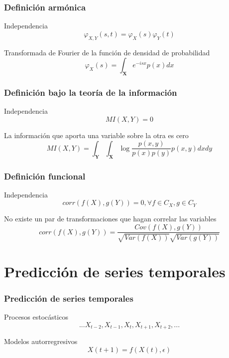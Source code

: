 \documentclass[t,9pt,pdftex]{beamer}
\begin{document}
\begin{frame}[c]
	\frametitle{Definici\'on arm\'onica}
	\begin{block}{Independencia}
		$$\varphi_{X,Y}(s,t) = \varphi_X(s)\varphi_Y(t)$$
	\end{block}
	
	\begin{exampleblock}{Transformada de Fourier de la funci\'on de densidad de probabilidad}
		$$\varphi_X(s) = \int_{\textbf{X}}{e^{-i s x} p(x)dx} $$
	\end{exampleblock}
\end{frame}



\begin{frame}[c]
	\frametitle{Definici\'on bajo la teor\'ia de la informaci\'on}
	\begin{block}{Independencia}
		$$MI(X,Y)=0$$
	\end{block}
	
	\begin{exampleblock}{La informaci\'on que aporta una variable sobre la otra es cero}
		$$MI(X,Y) = \int_{\textbf{Y}}{\int_{\textbf{X}}{ \log{ \frac{p(x,y)}{p(x) p(y)}}p(x,y) dx} dy} $$
	\end{exampleblock}
\end{frame}


\begin{frame}[c]
	\frametitle{Definici\'on funcional}
	\begin{block}{Independencia}
		$$corr(f(X), g(Y))=0, \mbox{} \forall f \in C_X, \mbox{} g \in C_Y$$
	\end{block}
	
	\begin{exampleblock}{No existe un par de transformaciones que hagan correlar las variables}
		$$corr(f(X), g(Y)) = \frac {Cov(f(X), g(Y))}{\sqrt{Var(f(X))} \sqrt{Var(g(Y))}} $$
	\end{exampleblock}
\end{frame}


\section{Predicci\'on de series temporales}

\begin{frame}[c]
	\frametitle{Predicci\'on de series temporales}
	\begin{block}{Procesos estoc\'asticos}
		$$... X_{t-2}, X_{t-1}, X_{t}, X_{t+1}, X_{t+2}, ...$$
	\end{block}
	
	\begin{exampleblock}{Modelos autorregresivos}
		$$X(t+1)=f(X(t), \epsilon)$$
	\end{exampleblock}
\end{frame}
\end{document}
